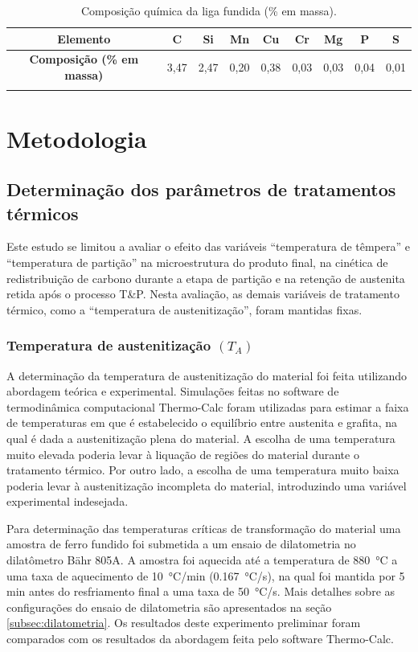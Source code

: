 \begin{table}
  \caption{Composição química da liga fundida (\% em massa).}
  \begin{tabular}{c c c c c c c c c}
  \thickhline
  \textbf{Elemento} & C & Si & Mn & Cu & Cr & Mg & P & S \\
  \hline
  \textbf{Composição (\% em massa)} & 3,47 & 2,47 & 0,20 & 0,38 & 0,03 & 0,03 & 0,04 & 0,01 \\
  \thickhline
  \end{tabular}
  \label{tab:CQ}
\end{table}

\section{Metodologia}

\subsection{Determinação dos parâmetros de tratamentos térmicos}

Este estudo se limitou a avaliar o efeito das variáveis ``temperatura de têmpera'' e ``temperatura de partição'' na microestrutura do produto final, na cinética de redistribuição de carbono durante a etapa de partição e na retenção de austenita retida após o processo T\&P. Nesta avaliação, as demais variáveis de tratamento térmico, como a ``temperatura de austenitização'', foram mantidas fixas.

\subsubsection*{Temperatura de austenitização $(T_A)$}

A determinação da temperatura de austenitização do material foi feita utilizando abordagem teórica e experimental. Simulações feitas no software de termodinâmica computacional Thermo-Calc\textregistered{} foram utilizadas para estimar a faixa de temperaturas em que é estabelecido o equilíbrio entre austenita e grafita, na qual é dada a austenitização plena do material. A escolha de uma temperatura muito elevada poderia levar à liquação de regiões do material durante o tratamento térmico. Por outro lado, a escolha de uma temperatura muito baixa poderia levar à austenitização incompleta do material, introduzindo uma variável experimental indesejada.

Para determinação das temperaturas críticas de transformação do material uma amostra de ferro fundido foi submetida a um ensaio de dilatometria no dilatômetro Bähr 805A. A amostra foi aquecida até a temperatura de \SI{880}{\degreeCelsius} a uma taxa de aquecimento de \SI{10}{\degreeCelsius/min} (\SI{0.167}{\degreeCelsius/s}), na qual foi mantida por 5 min antes do resfriamento final a uma taxa de \SI{50}{\degreeCelsius/s}. Mais detalhes sobre as configurações do ensaio de dilatometria são apresentados na seção \ref{subsec:dilatometria}. Os resultados deste experimento preliminar foram comparados com os resultados da abordagem feita pelo software Thermo-Calc\textregistered{}.

